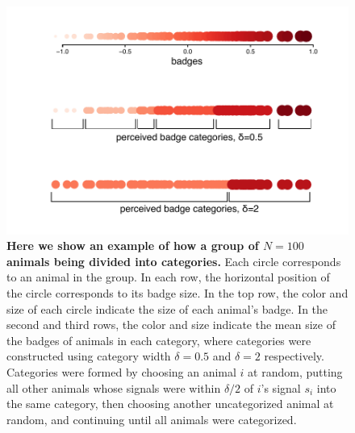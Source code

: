 \begin{figure}[ht]
\includegraphics[width=.8\textwidth]{figures/categories.pdf}
\caption{\sffamily\small\textbf{Here we show an example of how a group of $N=100$ animals being divided into categories.} 
Each circle corresponds to an animal in the group. In each row, the horizontal position of the circle corresponds to its badge size. In the top row, the color and size of each circle indicate the size of each animal's badge. In the second and third rows, the color and size indicate the mean size of the badges of animals in each category, where categories were constructed using category width $\delta=0.5$ and $\delta=2$ respectively. Categories were formed by choosing an animal $i$ at random, putting all other animals whose signals were within $\delta/2$ of $i$'s signal $s_i$ into the same category, then choosing another uncategorized animal at random, and continuing until all animals were categorized.}
 \label{cats_ex}
\end{figure}

